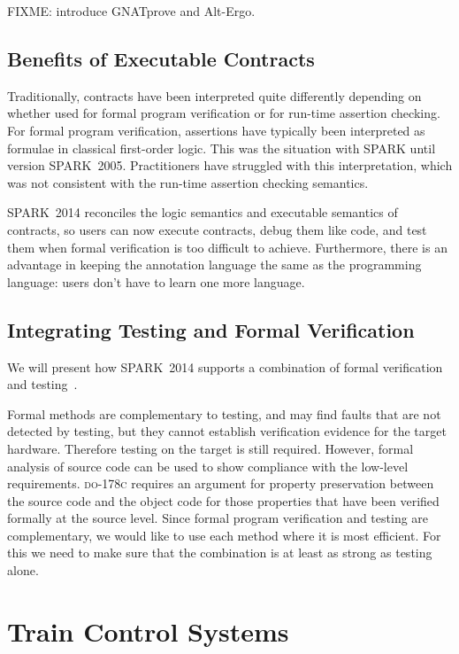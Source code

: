 \documentclass[10pt,a4paper,twocolumn]{article}
\newcommand{\DOC}{\textsc{do-178c}\xspace}
\newcommand{\gnatprove}{GNATprove\xspace}
\newcommand{\oldspark}{SPARK~2005\xspace}
\newcommand{\newspark}{SPARK~2014\xspace}
\newcommand{\altergo}{Alt-Ergo\xspace}
\begin{document}
FIXME: introduce \gnatprove and \altergo.

\subsection{Benefits of Executable Contracts}

Traditionally, contracts have been interpreted quite differently depending on
whether used for formal program verification or for run-time assertion
checking. For formal program verification, assertions have typically been
interpreted as formulae in classical first-order logic. This was the situation
with SPARK until version \oldspark. Practitioners have struggled with this
interpretation, which was not consistent with the run-time assertion checking
semantics.\cite{tseChalin10}

\newspark reconciles the logic semantics and executable semantics of contracts,
so users can now execute contracts, debug them like code, and test them when
formal verification is too difficult to achieve. Furthermore, there is an
advantage in keeping the annotation language the same as the programming
language: users don't have to learn one more language.

\subsection{Integrating Testing and Formal Verification}

\ifdefined\abstractonly

We will present how \newspark supports a combination of formal verification and
testing~\cite{hiliteERTS2012}.

\else
Formal methods are complementary to testing, and may find faults that
are not detected by testing, but they cannot establish verification
evidence for the target hardware. Therefore testing on the target is
still required. However, formal analysis of source code can be used to
show compliance with the low-level requirements. \DOC requires an
argument for property preservation between the source code and the
object code for those properties that have been verified formally at
the source level. Since formal program verification and testing are
complementary, we would like to use each method where it is most
efficient. For this we need to make sure that the combination is at
least as strong as testing alone.
\fi

\section{Train Control Systems}
\end{document}
